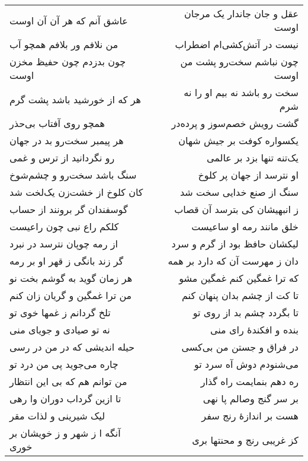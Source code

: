 \begin{center}
\begin{longtable}{l p{0.5cm} r}
\\
عاشق آنم که هر آن آن اوست
&&
عقل و جان جاندار یک مرجان اوست
\\
من نلافم ور بلافم همچو آب
&&
نیست در آتش‌کشی‌ام اضطراب
\\
چون بدزدم چون حفیظ مخزن اوست
&&
چون نباشم سخت‌رو پشت من اوست
\\
هر که از خورشید باشد پشت گرم
&&
سخت رو باشد نه بیم او را نه شرم
\\
همچو روی آفتاب بی‌حذر
&&
گشت رویش خصم‌سوز و پرده‌در
\\
هر پیمبر سخت‌رو بد در جهان
&&
یکسواره کوفت بر جیش شهان
\\
رو نگردانید از ترس و غمی
&&
یک‌تنه تنها بزد بر عالمی
\\
سنگ باشد سخت‌رو و چشم‌شوخ
&&
او نترسد از جهان پر کلوخ
\\
کان کلوخ از خشت‌زن یک‌لخت شد
&&
سنگ از صنع خدایی سخت شد
\\
گوسفندان گر برونند از حساب
&&
ز انبهیشان کی بترسد آن قصاب
\\
کلکم راع نبی چون راعیست
&&
خلق مانند رمه او ساعیست
\\
از رمه چوپان نترسد در نبرد
&&
لیکشان حافظ بود از گرم و سرد
\\
گر زند بانگی ز قهر او بر رمه
&&
دان ز مهرست آن که دارد بر همه
\\
هر زمان گوید به گوشم بخت نو
&&
که ترا غمگین کنم غمگین مشو
\\
من ترا غمگین و گریان زان کنم
&&
تا کت از چشم بدان پنهان کنم
\\
تلخ گردانم ز غمها خوی تو
&&
تا بگردد چشم بد از روی تو
\\
نه تو صیادی و جویای منی
&&
بنده و افکندهٔ رای منی
\\
حیله اندیشی که در من در رسی
&&
در فراق و جستن من بی‌کسی
\\
چاره می‌جوید پی من درد تو
&&
می‌شنودم دوش آه سرد تو
\\
من توانم هم که بی این انتظار
&&
ره دهم بنمایمت راه گذار
\\
تا ازین گرداب دوران وا رهی
&&
بر سر گنج وصالم پا نهی
\\
لیک شیرینی و لذات مقر
&&
هست بر اندازهٔ رنج سفر
\\
آنگه ا ز شهر و ز خویشان بر خوری
&&
کز غریبی رنج و محنتها بری
\\
\end{longtable}
\end{center}
